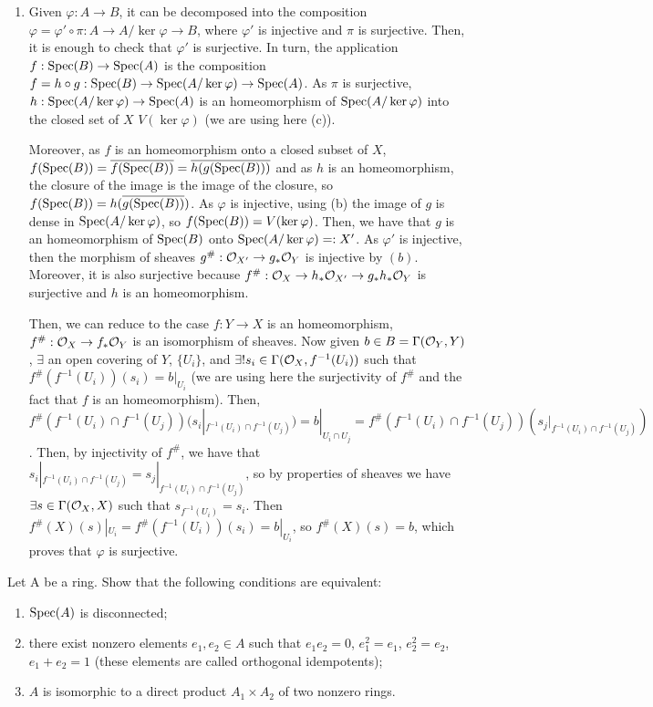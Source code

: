 \begin{sol}
\begin{enumerate}[label=\alph*)]
		\item Given $\varphi: A \to B$, it can be decomposed into the composition $\varphi = \varphi' \circ \pi: A \to A/\ker \varphi \to B$, where $\varphi'$ is injective and $\pi$ is surjective. Then, it is enough to check that $\varphi'$ is surjective. In turn, the application $f: \mathrm{Spec}(B) \to \mathrm{Spec}(A)$ is the composition $f = h \circ g: \mathrm{Spec}(B) \to \mathrm{Spec}(A/\ker \varphi) \to \mathrm{Spec}(A)$. As $\pi$ is surjective, $h: \mathrm{Spec}(A/\ker \varphi) \to \mathrm{Spec}(A)$ is an homeomorphism of $\mathrm{Spec}(A/\ker \varphi)$ into the closed set of $X$ $V(\ker \varphi)$ (we are using here (c)).

		Moreover, as $f$ is an homeomorphism onto a closed subset of $X$, $f(\mathrm{Spec}(B)) = \overline{f(\mathrm{Spec}(B))} = \overline{h(g(\mathrm{Spec}(B)))}$ and as $h$ is an homeomorphism, the closure of the image is the image of the closure, so $f(\mathrm{Spec}(B)) = h(\overline{g(\mathrm{Spec}(B))})$. As $\varphi$ is injective, using (b) the image of $g$ is dense in $\mathrm{Spec}(A/\ker \varphi)$, so $f(\mathrm{Spec}(B)) = V(\ker \varphi)$. Then, we have that $g$ is an homeomorphism of $\mathrm{Spec}(B)$ onto $\mathrm{Spec}(A/\ker \varphi) =: X'$. As $\varphi'$ is injective, then the morphism of sheaves $g^{\#}: \mathcal{O}_{X'} \to g_* \mathcal{O}_{Y}$ is injective by $(b)$. Moreover, it is also surjective because $f^{\#}: \mathcal{O}_X \to h_*\mathcal{O}_{X'} \to g_* h_* \mathcal{O}_Y$ is surjective and $h$ is an homeomorphism.

		Then, we can reduce to the case $f: Y \to X$ is an homeomorphism, $f^{\#}: \mathcal{O}_X \to f_* \mathcal{O}_Y$ is an isomorphism of sheaves. Now given $b \in B = \Gamma(\mathcal{O}_Y, Y)$, $\exists$ an open covering of $Y$, $\{U_i\}$, and $\exists ! s_i \in \Gamma(\mathcal{O}_X, f^{-1}(U_i))$ such that $f^{\#}(f^{-1}(U_i))(s_i) = b|_{U_i}$ (we are using here the surjectivity of $f^{\#}$ and the fact that $f$ is an homeomorphism). Then, $f^{\#}(f^{-1}(U_i) \cap f^{-1}(U_j))(s_i|_{f^{-1}(U_i) \cap f^{-1}(U_j)}) = b|_{U_i \cap U_j} = f^{\#}(f^{-1}(U_i) \cap f^{-1}(U_j))(s_j|_{f^{-1}(U_i) \cap f^{-1}(U_j)})$. Then, by injectivity of $f^{\#}$, we have that $s_i|_{f^{-1}(U_i) \cap f^{-1}(U_j)} = s_j|_{f^{-1}(U_i) \cap f^{-1}(U_j)}$, so by properties of sheaves we have $\exists s \in \Gamma(\mathcal{O}_X, X)$ such that $s_{f^{-1}(U_i)} = s_i$. Then $f^{\#}(X)(s)|_{U_i} = f^{\#}(f^{-1}(U_i))(s_i) = b|_{U_i}$, so $f^{\#}(X)(s) = b$, which proves that $\varphi$ is surjective.
		\end{enumerate}
\end{sol}

\begin{ex}
	Let A be a ring. Show that the following conditions are equivalent:
	\begin{enumerate}[label=\roman*)]
		\item $\mathrm{Spec}(A)$ is disconnected;
		\item there exist nonzero elements $e_1, e_2 \in A$ such that $e_1e_2 = 0$, $e_1^2 = e_1$, $e_2^2 = e_2$, $e_1 + e_2 = 1$ (these elements are called orthogonal idempotents);
		\item $A$ is isomorphic to a direct product $A_1 \times A_2$ of two nonzero rings.
	\end{enumerate}
\end{ex}

